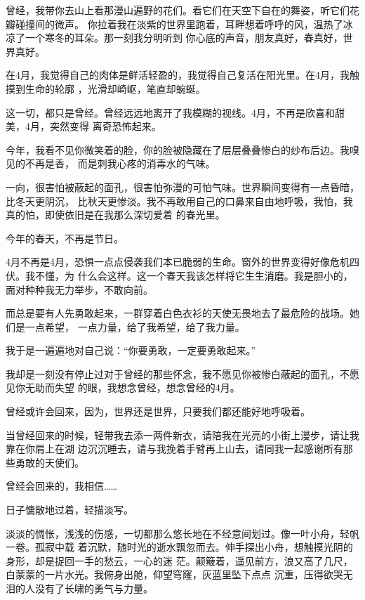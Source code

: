\documentclass[12pt,a4paper]{article}
\begin{document}
		曾经，我带你去山上看那漫山遍野的花们。看它们在天空下自在的舞姿，听它们花瓣碰撞间的微声。
	你拉着我在淡紫的世界里跑着，耳畔想着呼呼的风，温热了冰凉了一个寒冬的耳朵。那一刻我分明听到
	你心底的声音，朋友真好，春真好，世界真好。

		在4月，我觉得自己的肉体是鲜活轻盈的，我觉得自己复活在阳光里。在4月，我触摸到生命的轮廓
	，光滑却崎岖，笔直却蜿蜒。

		这一切，都只是曾经。曾经远远地离开了我模糊的视线。4月，不再是欣喜和甜美，4月，突然变得
	离奇恐怖起来。

		今年，我看不见你微笑着的脸，你的脸被隐藏在了层层叠叠惨白的纱布后边。我嗅见的不再是香，
	而是刺我心疼的消毒水的气味。

		一向，很害怕被蔽起的面孔，很害怕弥漫的可怕气味。世界瞬间变得有一点昏暗，比冬天更阴沉，
	比秋天更惨淡。我不再敢用自己的口鼻来自由地呼吸，我怕，我真的怕，即使依旧是在我那么深切爱着
	的春光里。

		今年的春天，不再是节日。

		4月不再是4月，恐惧一点点侵袭我们本已脆弱的生命。窗外的世界变得好像危机四伏。我不懂，为
	什么会这样。这一个春天我该怎样将它生生消磨。我是胆小的，面对种种我无力举步，不敢向前。

		而总是要有人先勇敢起来，一群穿着白色衣衫的天使无畏地去了最危险的战场。她们是一点希望，
	一点力量，给了我希望，给了我力量。

		我于是一遍遍地对自己说：“你要勇敢，一定要勇敢起来。”

		我却是一刻没有停止过对于曾经的那些怀念，我不愿见你被惨白蔽起的面孔，不愿见你无助而失望
	的眼，我想念曾经，想念曾经的4月。

		曾经或许会回来，因为，世界还是世界，只要我们都还能好地呼吸着。

		当曾经回来的时候，轻带我去添一两件新衣，请陪我在光亮的小街上漫步，请让我靠在你肩上在湖
	边沉沉睡去，请与我挽着手臂再上山去，请同我一起感谢所有那些勇敢的天使们。

		曾经会回来的，我相信……

	\endwriting



		日子慵散地过着，轻描淡写。

		淡淡的惆怅，浅浅的伤感，一切都那么悠长地在不经意间划过。像一叶小舟，轻帆一卷。孤寂中载
	着沉默，随时光的逝水飘忽而去。伸手探出小舟，想触摸光阴的身形，却是捉回一手的愁云，一心的迷
	茫。颠簸着，遥见前方，浪又高了几尺，白蒙蒙的一片水光。我俯身出舱，仰望穹窿，灰蓝里坠下点点
	沉重，压得欲哭无泪的人没有了长啸的勇气与力量。
\end{document}
